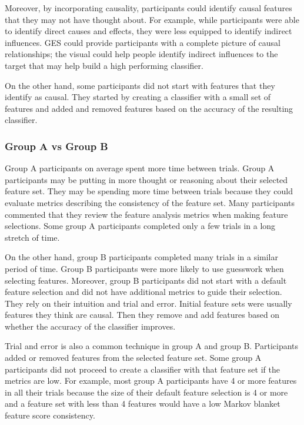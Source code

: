 Moreover, by incorporating causality, participants could identify causal features that they may not have thought about. For example, while participants were able to identify direct causes and effects, they were less equipped to identify indirect influences. GES could provide participants with a complete picture of causal relationships; the visual could help people identify indirect influences to the target that may help build a high performing classifier.

On the other hand, some participants did not start with features that they identify as causal. They started by creating a classifier with a small set of features and added and removed features based on the accuracy of the resulting classifier.

\subsubsection { Group A vs Group B }
Group A participants on average spent more time between trials. Group A participants may be putting in more thought or reasoning about their selected feature set. They may be spending more time between trials because they could evaluate metrics describing the consistency of the feature set. Many participants commented that they review the feature analysis metrics when making feature selections. Some group A participants completed only a few trials in a long stretch of time.

On the other hand, group B participants completed many trials in a similar period of time. Group B participants were more likely to use guesswork when selecting features. Moreover, group B participants did not start with a default feature selection and did not have additional metrics to guide their selection. They rely on their intuition and trial and error. Initial feature sets were usually features they think are causal. Then they remove and add features based on whether the accuracy of the classifier improves.

Trial and error is also a common technique in group A and group B. Participants added or removed features from the selected feature set. Some group A participants did not proceed to create a classifier with that feature set if the metrics are low. For example, most group A participants have 4 or more features in all their trials because the size of their default feature selection is 4 or more and a feature set with less than 4 features would have a low Markov blanket feature score consistency.

